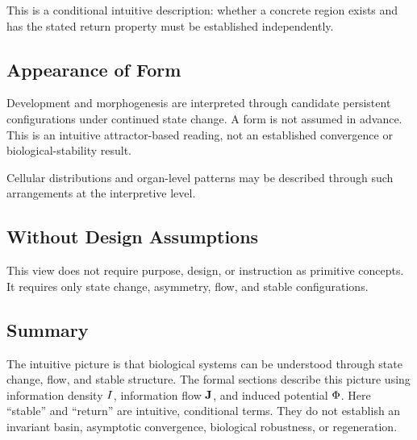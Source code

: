 This is a conditional intuitive description: whether a concrete region exists and has the stated return property must be established independently.

\subsection{Appearance of Form}

Development and morphogenesis are interpreted through candidate persistent configurations under continued state change. A form is not assumed in advance. This is an intuitive attractor-based reading, not an established convergence or biological-stability result.

Cellular distributions and organ-level patterns may be described through such arrangements at the interpretive level.

\subsection{Without Design Assumptions}

This view does not require purpose, design, or instruction as primitive concepts. It requires only state change, asymmetry, flow, and stable configurations.

\subsection{Summary}

The intuitive picture is that biological systems can be understood through state change, flow, and stable structure. The formal sections describe this picture using information density \(I\), information flow \(\mathbf{J}\), and induced potential \(\Phi\).
Here ``stable'' and ``return'' are intuitive, conditional terms. They do not establish an invariant basin, asymptotic convergence, biological robustness, or regeneration.
